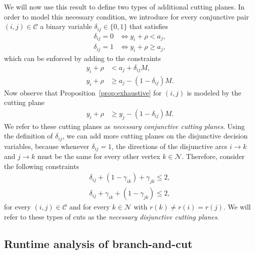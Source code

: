 \documentclass[a4paper]{article}
\theoremstyle{definition}
\theoremstyle{plain}
\begin{document}
We will now use this result to define two types of additional cutting planes. In
order to model this necessary condition, we introduce for every conjunctive pair
$(i,j) \in \mathcal{C}$ a binary variable $\delta_{ij} \in \{0, 1\}$ that satisfies
\begin{align*}
  \delta_{ij} = 0 &\iff y_{i} + \rho < a_{j} , \\
  \delta_{ij} = 1 &\iff y_{i} + \rho \geq a_{j} ,
\end{align*}
which can be enforced by adding to the constraints
\begin{align*}
  y_{i} + \rho &< a_{j} + \delta_{ij}M , \\
  y_{i} + \rho &\geq a_{j} - (1 - \delta_{ij}) M .
\end{align*}
Now observe that Proposition~\ref{prop:exhaustive} for $(i,j)$ is modeled by the
cutting plane
\begin{align*}
  y_{i} + \rho &\geq y_{j} - (1 - \delta_{ij}) M .
\end{align*}
We refer to these cutting planes as \textit{necessary conjunctive cutting planes}.
%
Using the definition of $\delta_{ij}$, we can add more cutting planes on the
disjunctive decision variables, because whenever $\delta_{ij} = 1$, the directions of
the disjunctive arcs $i \rightarrow k$ and $j \rightarrow k$ must be the same for every other vertex
$k \in \mathcal{N}$. Therefore, consider the following constraints
\begin{align*}
  \delta_{ij} + (1 - \gamma_{ik}) + \gamma_{jk} \leq 2 , \\
  \delta_{ij} + \gamma_{ik} + (1 - \gamma_{jk}) \leq 2 ,
\end{align*}
for every $(i,j) \in \mathcal{C}$ and for every $k \in \mathcal{N}$ with $r(k) \neq r(i) = r(j)$.
We will refer to these types of cuts as the \textit{necessary disjunctive cutting planes}.

\subsection{Runtime analysis of branch-and-cut}
\label{sec:runtime}
\end{document}
